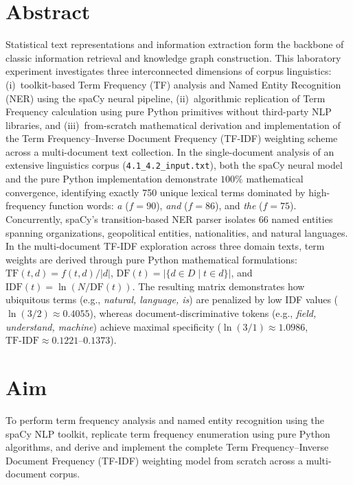 \documentclass[12pt,a4paper]{report}
\begin{document}
\section{Abstract}
Statistical text representations and information extraction form the backbone of classic information retrieval and knowledge graph construction. This laboratory experiment investigates three interconnected dimensions of corpus linguistics: (i)~toolkit-based Term Frequency (TF) analysis and Named Entity Recognition (NER) using the spaCy neural pipeline, (ii)~algorithmic replication of Term Frequency calculation using pure Python primitives without third-party NLP libraries, and (iii)~from-scratch mathematical derivation and implementation of the Term Frequency--Inverse Document Frequency (TF-IDF) weighting scheme across a multi-document text collection. In the single-document analysis of an extensive linguistics corpus (\texttt{4.1\_4.2\_input.txt}), both the spaCy neural model and the pure Python implementation demonstrate $100\%$ mathematical convergence, identifying exactly 750 unique lexical terms dominated by high-frequency function words: \textit{a} ($f=90$), \textit{and} ($f=86$), and \textit{the} ($f=75$). Concurrently, spaCy's transition-based NER parser isolates 66 named entities spanning organizations, geopolitical entities, nationalities, and natural languages. In the multi-document TF-IDF exploration across three domain texts, term weights are derived through pure Python mathematical formulations: $\text{TF}(t, d) = f(t, d)/|d|$, $\text{DF}(t) = |\{d \in D \mid t \in d\}|$, and $\text{IDF}(t) = \ln(N/\text{DF}(t))$. The resulting matrix demonstrates how ubiquitous terms (e.g., \textit{natural, language, is}) are penalized by low IDF values ($\ln(3/2) \approx 0.4055$), whereas document-discriminative tokens (e.g., \textit{field, understand, machine}) achieve maximal specificity ($\ln(3/1) \approx 1.0986$, $\text{TF-IDF} \approx 0.1221$--$0.1373$).

\section{Aim}
To perform term frequency analysis and named entity recognition using the spaCy NLP toolkit, replicate term frequency enumeration using pure Python algorithms, and derive and implement the complete Term Frequency--Inverse Document Frequency (TF-IDF) weighting model from scratch across a multi-document corpus.
\end{document}
